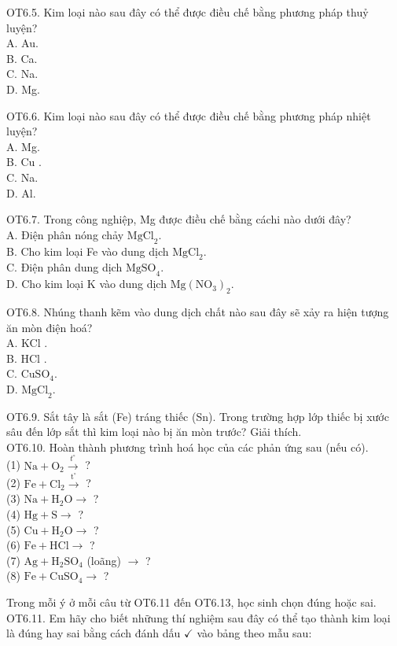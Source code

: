\documentclass[10pt]{article}
\begin{document}
OT6.5. Kim loại nào sau đây có thể được điều chế bằng phương pháp thuỷ luyện?\\
A. Au.\\
B. Ca.\\
C. Na.\\
D. Mg.

OT6.6. Kim loại nào sau đây có thể được điều chế bằng phương pháp nhiệt luyện?\\
A. Mg.\\
B. Cu .\\
C. Na.\\
D. Al.

OT6.7. Trong công nghiệp, Mg được điều chế bằng cáchi nào dưới đây?\\
A. Điện phân nóng chảy $\mathrm{MgCl}_{2}$.\\
B. Cho kim loại Fe vào dung dịch $\mathrm{MgCl}_{2}$.\\
C. Điện phân dung dịch $\mathrm{MgSO}_{4}$.\\
D. Cho kim loại K vào dung dịch $\mathrm{Mg}\left(\mathrm{NO}_{3}\right)_{2}$.

OT6.8. Nhúng thanh kẽm vào dung dịch chất nào sau đây sẽ xảy ra hiện tượng ăn mòn điện hoá?\\
A. KCl .\\
B. HCl .\\
C. $\mathrm{CuSO}_{4}$.\\
D. $\mathrm{MgCl}_{2}$.

OT6.9. Sắt tây là sắt (Fe) tráng thiếc (Sn). Trong trường hợp lớp thiếc bị xước sâu đến lớp sắt thì kim loại nào bị ăn mòn trước? Giải thích.\\
OT6.10. Hoàn thành phương trình hoá học của các phản ứng sau (nếu có).\\
(1) $\mathrm{Na}+\mathrm{O}_{2} \xrightarrow{t^{\circ}}$ ?\\
(2) $\mathrm{Fe}+\mathrm{Cl}_{2} \xrightarrow{\mathrm{t}^{\circ}}$ ?\\
(3) $\mathrm{Na}+\mathrm{H}_{2} \mathrm{O} \rightarrow$ ?\\
(4) $\mathrm{Hg}+\mathrm{S} \rightarrow$ ?\\
(5) $\mathrm{Cu}+\mathrm{H}_{2} \mathrm{O} \rightarrow$ ?\\
(6) $\mathrm{Fe}+\mathrm{HCl} \rightarrow$ ?\\
(7) $\mathrm{Ag}+\mathrm{H}_{2} \mathrm{SO}_{4}$ (loãng) $\rightarrow$ ?\\
(8) $\mathrm{Fe}+\mathrm{CuSO}_{4} \rightarrow$ ?

Trong mỗi ý ở mỗi câu từ OT6.11 đến OT6.13, học sinh chọn đúng hoặc sai.\\
OT6.11. Em hãy cho biết nhữung thí nghiệm sau đây có thể tạo thành kim loại là đúng hay sai bằng cách đánh dấu $\checkmark$ vào bảng theo mẫu sau:
\end{document}
